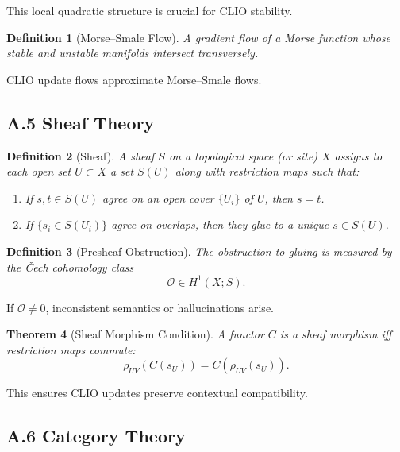 \documentclass[11pt,a4paper,twocolumn]{article}
\newtheorem{theorem}{Theorem}[section]
\newtheorem{definition}[theorem]{Definition}
\begin{document}
This local quadratic structure is crucial for CLIO stability.

\begin{definition}[Morse–Smale Flow]
A gradient flow of a Morse function whose stable and unstable manifolds
intersect transversely.
\end{definition}

CLIO update flows approximate Morse–Smale flows.


\subsection*{A.5 Sheaf Theory}

\begin{definition}[Sheaf]
A sheaf $S$ on a topological space (or site) $X$ assigns to each open set
$U \subset X$ a set $S(U)$ along with restriction maps such that:
\begin{enumerate}
\item If $s,t \in S(U)$ agree on an open cover $\{U_i\}$ of $U$, then
$s=t$.
\item If $\{s_i \in S(U_i)\}$ agree on overlaps, then they glue to a
unique $s \in S(U)$.
\end{enumerate}
\end{definition}

\begin{definition}[Presheaf Obstruction]
The obstruction to gluing is measured by the Čech cohomology class
\[
\mathcal{O} \in H^1(X; S).
\]
\end{definition}

If $\mathcal{O} \ne 0$, inconsistent semantics or hallucinations arise.

\begin{theorem}[Sheaf Morphism Condition]
A functor $C$ is a sheaf morphism iff restriction maps commute:
\[
\rho_{UV}(C(s_U)) = C(\rho_{UV}(s_U)).
\]
\end{theorem}

This ensures CLIO updates preserve contextual compatibility.


\subsection*{A.6 Category Theory}
\end{document}
